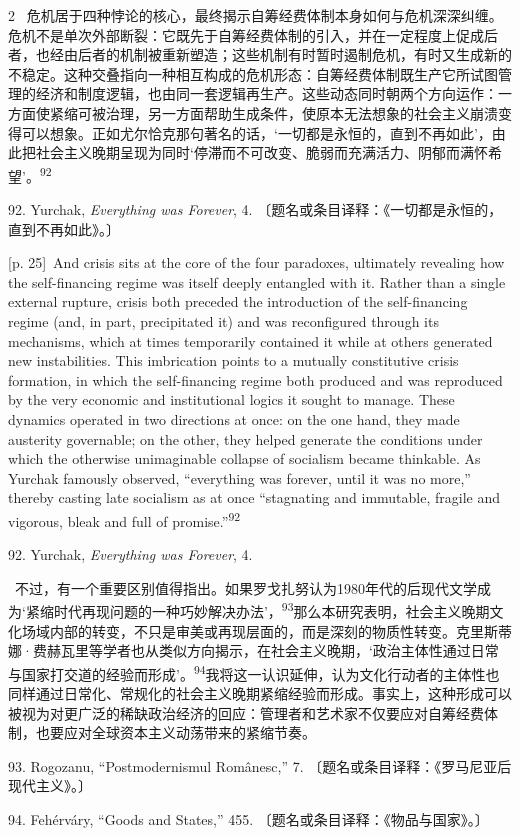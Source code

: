 \documentclass[10pt,a4paper]{article}
\begin{document}
\begin{paracol}{2}
\switchcolumn*
{\scriptsize\color{gray} [p. 25]}\ 危机居于四种悖论的核心，最终揭示自筹经费体制本身如何与危机深深纠缠。危机不是单次外部断裂：它既先于自筹经费体制的引入，并在一定程度上促成后者，也经由后者的机制被重新塑造；这些机制有时暂时遏制危机，有时又生成新的不稳定。这种交叠指向一种相互构成的危机形态：自筹经费体制既生产它所试图管理的经济和制度逻辑，也由同一套逻辑再生产。这些动态同时朝两个方向运作：一方面使紧缩可被治理，另一方面帮助生成条件，使原本无法想象的社会主义崩溃变得可以想象。正如尤尔恰克那句著名的话，‘一切都是永恒的，直到不再如此’，由此把社会主义晚期呈现为同时‘停滞而不可改变、脆弱而充满活力、阴郁而满怀希望’。\nobreak\textsuperscript{92}\par{\small 92. Yurchak, \textit{Everything was Forever}, 4. 〔题名或条目译释：《一切都是永恒的，直到不再如此》。〕\par}
\switchcolumn
{\scriptsize\color{gray} [p. 25]}\ And crisis sits at the core of the four paradoxes, ultimately revealing how the self-financing regime was itself deeply entangled with it. Rather than a single external rupture, crisis both preceded the introduction of the self-financing regime (and, in part, precipitated it) and was reconfigured through its mechanisms, which at times temporarily contained it while at others generated new instabilities. This imbrication points to a mutually constitutive crisis formation, in which the self-financing regime both produced and was reproduced by the very economic and institutional logics it sought to manage. These dynamics operated in two directions at once: on the one hand, they made austerity governable; on the other, they helped generate the conditions under which the otherwise unimaginable collapse of socialism became thinkable. As Yurchak famously observed, “everything was forever, until it was no more,” thereby casting late socialism as at once “stagnating and immutable, fragile and vigorous, bleak and full of promise.”\nobreak\textsuperscript{92}\par{\small 92. Yurchak, \textit{Everything was Forever}, 4.\par}
\switchcolumn*
{\scriptsize\color{gray} [p. 26]}\ 不过，有一个重要区别值得指出。如果罗戈扎努认为1980年代的后现代文学成为‘紧缩时代再现问题的一种巧妙解决办法’，\nobreak\textsuperscript{93}那么本研究表明，社会主义晚期文化场域内部的转变，不只是审美或再现层面的，而是深刻的物质性转变。克里斯蒂娜·费赫瓦里等学者也从类似方向揭示，在社会主义晚期，‘政治主体性通过日常与国家打交道的经验而形成’。\nobreak\textsuperscript{94}我将这一认识延伸，认为文化行动者的主体性也同样通过日常化、常规化的社会主义晚期紧缩经验而形成。事实上，这种形成可以被视为对更广泛的稀缺政治经济的回应：管理者和艺术家不仅要应对自筹经费体制，也要应对全球资本主义动荡带来的紧缩节奏。\par{\small 93. Rogozanu, “Postmodernismul Românesc,” 7. 〔题名或条目译释：《罗马尼亚后现代主义》。〕\par}{\small 94. Fehérváry, “Goods and States,” 455. 〔题名或条目译释：《物品与国家》。〕\par}

\end{paracol}
\end{document}
